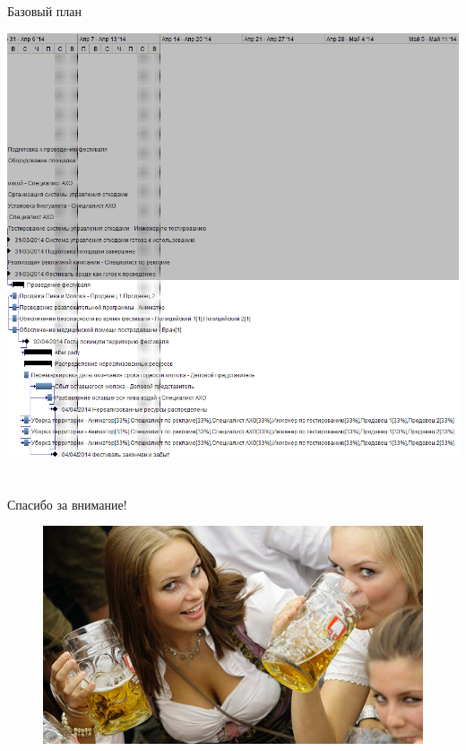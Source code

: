 \documentclass[10pt,pdf,hyperref=unicode,hyperref={bookmarks=false}]{beamer}
\begin{document}
\begin{frame}[allowframebreaks]{Базовый план}
\begin{center}
        \framebreak
        \includegraphics[keepaspectratio=true,width=\textwidth,height=0.8\textheight]{gant33.png}
      \end{center}
    \end{frame}
  \section*{}
  \begin{frame}{Спасибо за внимание!}
    \begin{figure}
      \includegraphics[width=\textwidth]{beers1.jpg}
    \end{figure}
  \end{frame}
\end{document}
